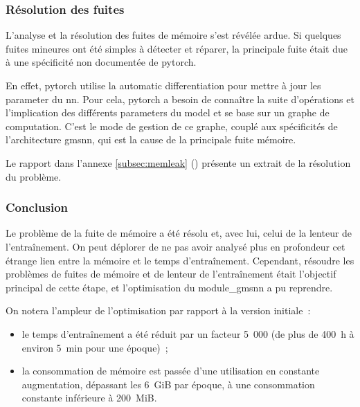 \subsubsection{Résolution des fuites}
L'analyse et la résolution des fuites de mémoire s'est révélée ardue. Si quelques fuites mineures ont été simples à détecter et réparer, la principale fuite était due à une spécificité non documentée de \gls{pytorch}.

En effet, \gls{pytorch} utilise la \gls{automatic differentiation} pour mettre à jour les \gls{parameter} du \gls{nn}.
Pour cela, \gls{pytorch} a besoin de connaître la suite d'opérations et l'implication des différents \glspl{parameter} du \gls{model} et se base sur un \og graphe de computation\fg{}.
C'est le mode de gestion de ce graphe, couplé aux spécificités de l'architecture \gls{gmsnn}, qui est la cause de la principale fuite mémoire.

Le rapport dans l'annexe \ref{subsec:memleak} () présente un extrait de la résolution du problème.

\subsubsection{Conclusion}
Le problème de la fuite de mémoire a été résolu et, avec lui, celui de la lenteur de l'entraînement.
On peut déplorer de ne pas avoir analysé plus en profondeur cet étrange lien entre la mémoire et le temps d'entraînement.
Cependant, résoudre les problèmes de fuites de mémoire et de lenteur de l'entraînement était l'objectif principal de cette étape, et l'optimisation du \gls{module_gmsnn} a pu reprendre.

On notera l'ampleur de l'optimisation par rapport à la version initiale~:
\begin{itemize}
	\item le temps d'entraînement a été réduit par un facteur 5~000 (de plus de 400~h à environ 5~min pour une époque)~;
	\item la consommation de mémoire est passée d'une utilisation en constante augmentation, dépassant les 6~GiB par époque, à une consommation constante inférieure à 200~MiB.
\end{itemize}\vspace{1em}